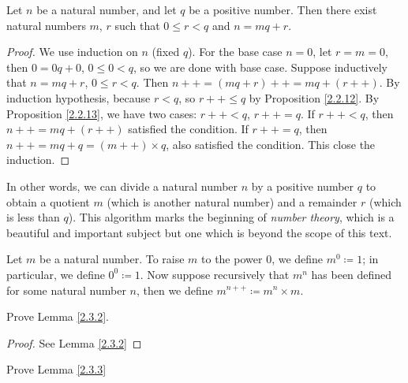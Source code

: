 \begin{proposition}\label{2.3.9}
Let \(n\) be a natural number, and let \(q\) be a positive number.
Then there exist natural numbers \(m\), \(r\) such that \(0 \leq r<q\) and \(n = mq + r\).
\end{proposition}

\begin{proof}
We use induction on \(n\) (fixed \(q\)).
For the base case \(n = 0\), let \(r = m = 0\), then \(0 = 0q + 0\), \(0 \leq 0 < q\), so we are done with base case.
Suppose inductively that \(n = mq + r\), \(0 \leq r < q\).
Then \(n++ = (mq + r)++ = mq + (r++)\).
By induction hypothesis, because \(r < q\), so \(r++ \leq q\) by Proposition \ref{2.2.12}.
By Proposition \ref{2.2.13}, we have two cases: \(r++ < q\), \(r++ = q\).
If \(r++ < q\), then \(n++ = mq + (r++)\) satisfied the condition.
If \(r++ = q\), then \(n++ = mq + q = (m++) \times q\), also satisfied the condition.
This close the induction.
\end{proof}

\begin{remark}\label{2.3.10}
In other words, we can divide a natural number \(n\) by a positive number \(q\) to obtain a quotient \(m\) (which is another natural number) and a remainder \(r\) (which is less than \(q\)).
This algorithm marks the beginning of \emph{number theory}, which is a beautiful and important subject but one which is beyond the scope of this text.
\end{remark}

\begin{definition}\label{2.3.11}
Let \(m\) be a natural number.
To raise \(m\) to the power \(0\), we define \(m^0 \coloneqq 1\); in particular, we define \(0^0 \coloneqq 1\).
Now suppose recursively that \(m^n\) has been defined for some natural number \(n\), then we define \(m^{n++} \coloneqq m^n \times m\).
\end{definition}

\exercisesection

\begin{exercise}\label{ex 2.3.1}
Prove Lemma \ref{2.3.2}.
\end{exercise}

\begin{proof}
See Lemma \ref{2.3.2}
\end{proof}

\begin{exercise}\label{ex 2.3.2}
Prove Lemma \ref{2.3.3}
\end{exercise}

